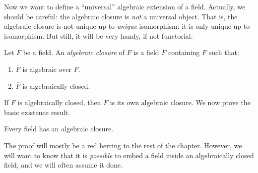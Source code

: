\noindent
Now we want to define a ``universal'' algebraic extension of a field.
Actually, we should be careful: the algebraic closure is {\it not} a
universal object. That is, the algebraic closure is not unique up to
{\it unique} isomorphism: it is only unique up to isomorphism. But still,
it will be very handy, if not functorial.

\begin{definition}
\label{definition-algebraic-closure}
Let $F$ be a field. An {\it algebraic closure} of $F$ is a field
$\overline{F}$ containing $F$ such that:
\begin{enumerate}
\item $\overline{F}$ is algebraic over $F$.
\item $\overline{F}$ is algebraically closed.
\end{enumerate}
\end{definition}

\noindent
If $F$ is algebraically closed, then $F$ is its own algebraic closure.
We now prove the basic existence result.

\begin{theorem}
\label{theorem-existence-algebraic-closure}
Every field has an algebraic closure.
\end{theorem}

\noindent
The proof will mostly be a red herring to the rest of the chapter. However, we
will want to know that it is {\it possible} to embed a field inside an
algebraically closed field, and we will often assume it done.

